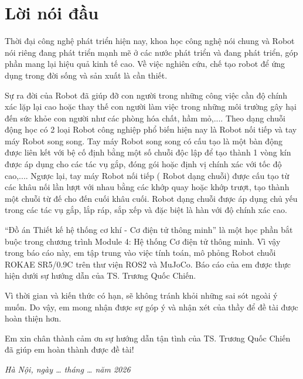 \chapter*{Lời nói đầu}


Thời đại công nghệ phát triển hiện nay, khoa học công nghệ nói chung và Robot nói riêng đang phát triển mạnh mẽ ở các nước phát triển và đang phát triển, góp phần mang lại hiệu quả kinh tế cao. Về việc nghiên cứu, chế tạo robot để ứng dụng trong đời sống và sản xuất là cần thiết.

Sự ra đời của Robot đã giúp đỡ con người trong những công việc cần độ chính xác lặp lại cao hoặc thay thế con người làm việc trong những môi trường gây hại đến sức khỏe con người như các phòng hóa chất, hầm mỏ,.... Theo dạng chuỗi động học có 2 loại Robot công nghiệp phổ biến hiện nay là Robot nối tiếp và tay máy Robot song song. Tay máy Robot song song có cấu tạo là một bàn động được liên kết với bệ cố định bằng một số chuỗi độc lập để tạo thành 1 vòng kín được áp dụng cho các tác vụ gắp, đóng gói hoặc định vị chính xác với tốc độ cao,.... Ngược lại, tay máy Robot nối tiếp ( Robot dạng chuỗi) được cấu tạo từ các khâu nối lần lượt với nhau bằng các khớp quay hoặc khớp trượt, tạo thành một chuỗi từ đế cho đến cuối khâu cuối. Robot dạng chuỗi được áp dụng chủ yếu trong các tác vụ gắp, lắp ráp, sắp xếp và đặc biệt là hàn với độ chính xác cao.

“Đồ án Thiết kế hệ thống cơ khí - Cơ điện tử thông minh” là một học phần bắt buộc trong chương trình Module 4: Hệ thống Cơ điện tử thông minh. Vì vậy trong báo cáo này, em tập trung vào việc tính toán, mô phỏng Robot chuỗi ROKAE SR5/0.9C trên thư viện ROS2 và MuJoCo. Báo cáo của em được thực hiện dưới sự hướng dẫn của TS. Trương Quốc Chiến.

Vì thời gian và kiến thức có hạn, sẽ không tránh khỏi những sai sót ngoài ý muốn. Do vậy, em mong nhận được sự góp ý và nhận xét của thầy để đề tài được hoàn thiện hơn.

Em xin chân thành cảm ơn sự hướng dẫn tận tình của TS. Trương Quốc Chiến đã giúp em hoàn thành được đề tài!

\begin{flushright}\itshape Hà Nội, ngày \ldots{} tháng \ldots{} năm 2026\end{flushright}
